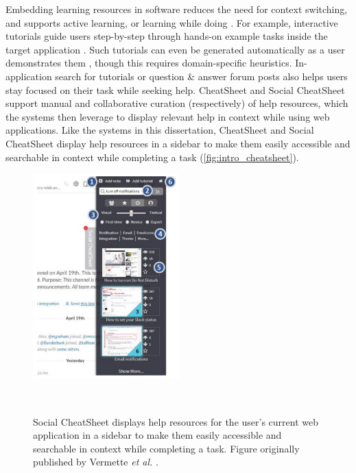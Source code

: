 Embedding learning resources in software reduces the need for context switching, and supports active learning, or learning while doing \cite{Bonwell1991, Grossman2010a, Matejka2011, Ichinco2017, Matejka2009, Greene2002}. For example, interactive tutorials guide users step-by-step through hands-on example tasks inside the target application \cite{Kelleher2005, Lafreniere2014a, Pongnumkul2011}. Such tutorials can even be generated automatically as a user demonstrates them \cite{Grabler2009}, though this requires domain-specific heuristics. In-application search for tutorials \cite{Lafreniere2014a} or question \& answer forum posts \cite{Chilana2012} also helps users stay focused on their task while seeking help. CheatSheet \cite{Vermette2015} and Social CheatSheet \cite{Vermette2017} support manual and collaborative curation (respectively) of help resources, which the systems then leverage to display relevant help in context while using web applications. Like the systems in this dissertation, CheatSheet and Social CheatSheet display help resources in a sidebar to make them easily accessible and searchable in context while completing a task (\autoref{fig:intro_cheatsheet}).

\begin{figure}[b!]
\centering
  \includegraphics[width=0.5\textwidth]{figures/social-cheatsheet.png}
  \caption{Social CheatSheet displays help resources for the user's current web application in a sidebar to make them easily accessible and searchable in context while completing a task. Figure originally published by Vermette \textit{et al.} \cite{Vermette2017}.}~\label{fig:intro_cheatsheet}
\end{figure}

